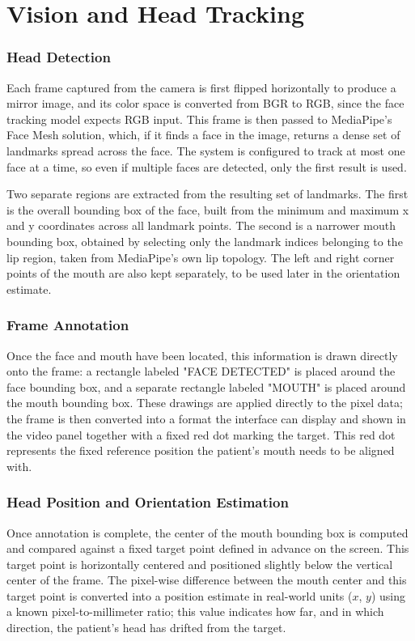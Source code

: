 \section{Vision and Head Tracking}

\subsubsection{Head Detection}
Each frame captured from the camera is first flipped horizontally to produce a mirror image, and its color space is converted from BGR to RGB, since the face tracking model expects RGB input. This frame is then passed to MediaPipe's Face Mesh solution, which, if it finds a face in the image, returns a dense set of landmarks spread across the face. The system is configured to track at most one face at a time, so even if multiple faces are detected, only the first result is used.

Two separate regions are extracted from the resulting set of landmarks. The first is the overall bounding box of the face, built from the minimum and maximum x and y coordinates across all landmark points. The second is a narrower mouth bounding box, obtained by selecting only the landmark indices belonging to the lip region, taken from MediaPipe's own lip topology. The left and right corner points of the mouth are also kept separately, to be used later in the orientation estimate.

\subsubsection{Frame Annotation}
Once the face and mouth have been located, this information is drawn directly onto the frame: a rectangle labeled "FACE DETECTED" is placed around the face bounding box, and a separate rectangle labeled "MOUTH" is placed around the mouth bounding box. These drawings are applied directly to the pixel data; the frame is then converted into a format the interface can display and shown in the video panel together with a fixed red dot marking the target. This red dot represents the fixed reference position the patient's mouth needs to be aligned with.

\subsubsection{Head Position and Orientation Estimation}
Once annotation is complete, the center of the mouth bounding box is computed and compared against a fixed target point defined in advance on the screen. This target point is horizontally centered and positioned slightly below the vertical center of the frame. The pixel-wise difference between the mouth center and this target point is converted into a position estimate in real-world units ($x$, $y$) using a known pixel-to-millimeter ratio; this value indicates how far, and in which direction, the patient's head has drifted from the target.

